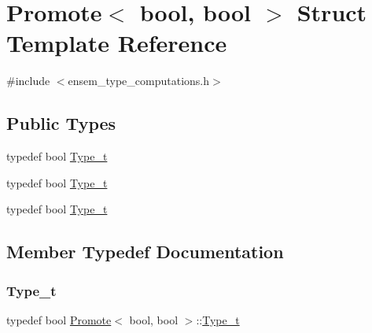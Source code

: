 \hypertarget{structPromote_3_01bool_00_01bool_01_4}{}\section{Promote$<$ bool, bool $>$ Struct Template Reference}
\label{structPromote_3_01bool_00_01bool_01_4}


{\ttfamily \#include $<$ensem\+\_\+type\+\_\+computations.\+h$>$}

\subsection*{Public Types}
\begin{DoxyCompactItemize}
\item 
typedef bool \mbox{\hyperlink{structPromote_3_01bool_00_01bool_01_4_a102643eea236300318f1131229a59556}{Type\+\_\+t}}
\item 
typedef bool \mbox{\hyperlink{structPromote_3_01bool_00_01bool_01_4_a102643eea236300318f1131229a59556}{Type\+\_\+t}}
\item 
typedef bool \mbox{\hyperlink{structPromote_3_01bool_00_01bool_01_4_a102643eea236300318f1131229a59556}{Type\+\_\+t}}
\end{DoxyCompactItemize}


\subsection{Member Typedef Documentation}
\mbox{\label{structPromote_3_01bool_00_01bool_01_4_a102643eea236300318f1131229a59556}} 
\subsubsection{\texorpdfstring{Type\_t}{Type\_t}\hspace{0.1cm}{\footnotesize\ttfamily [1/3]}}
{\footnotesize\ttfamily typedef bool \mbox{\hyperlink{structPromote}{Promote}}$<$ bool, bool $>$\+::\mbox{\hyperlink{structPromote_3_01bool_00_01bool_01_4_a102643eea236300318f1131229a59556}{Type\+\_\+t}}}

\mbox{\label{structPromote_3_01bool_00_01bool_01_4_a102643eea236300318f1131229a59556}} 

